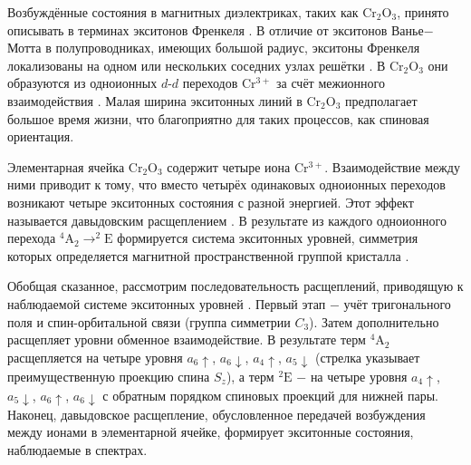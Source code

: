 \documentclass[14pt]{extarticle}
\newcommand{\crome}{\mathrm{Cr}_{2}\mathrm{O}_{3}}
\numberwithin{equation}{section}
\begin{document}
Возбуждённые состояния в магнитных диэлектриках, таких как $\crome$, принято описывать в терминах экситонов Френкеля \cite{Loudon1968}. В отличие от экситонов Ванье$-$Мотта в полупроводниках, имеющих большой радиус, экситоны Френкеля локализованы на одном или нескольких соседних узлах решётки \cite{Frenkel}. В $\crome$ они образуются из одноионных $d$-$d$ переходов Cr$^{3+}$ за счёт межионного взаимодействия \cite{Allen1969}. Малая ширина экситонных линий в $\crome$ \cite{Allen1969} предполагает большое время жизни, что  благоприятно для таких процессов, как спиновая ориентация.

Элементарная ячейка $\crome$ содержит четыре иона Cr$^{3+}$. Взаимодействие между ними приводит к тому, что вместо четырёх одинаковых одноионных переходов возникают четыре экситонных состояния с разной энергией. Этот эффект называется давыдовским расщеплением \cite{VanderZiel, Allen1969}. В результате из каждого одноионного перехода $^4\mathrm{A}_2 \to ^2\mathrm{E}$ формируется система экситонных уровней, симметрия которых определяется магнитной пространственной группой кристалла \cite{Allen1969}.

Обобщая сказанное, рассмотрим последовательность расщеплений, приводящую к наблюдаемой системе экситонных уровней \cite{Allen1969}. Первый этап $-$ учёт тригонального поля и спин-орбитальной связи (группа симметрии $C_3$). Затем дополнительно расщепляет уровни обменное взаимодействие.  В результате терм $^4\mathrm{A}_2$ расщепляется на четыре уровня $a_6\uparrow$, $a_6\downarrow$, $a_4\uparrow$, $a_5\downarrow$ (стрелка указывает преимущественную проекцию спина $S_z$), а терм $^2\mathrm{E}$ $-$ на четыре уровня $a_4\uparrow$, $a_5\downarrow$, $a_6\uparrow$, $a_6\downarrow$ с обратным порядком спиновых проекций для нижней пары. Наконец, давыдовское расщепление, обусловленное передачей возбуждения между ионами в элементарной ячейке, формирует экситонные состояния, наблюдаемые в спектрах.
\end{document}
